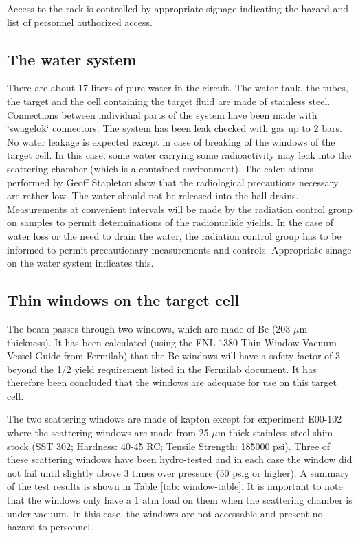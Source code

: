 {Access to the rack is controlled by appropriate signage indicating
the hazard and list of personnel authorized access.


\begin{safetyen}{10}{10}
\subsection{The water system}
\end{safetyen}

There are about 17 liters of pure water in the circuit. The water
tank, the tubes, the target and the cell containing the target fluid
are made of stainless steel. Connections between individual parts
of the system have been made with \char`\"{}swagelok\char`\"{} connectors.
The system has been leak checked with gas up to 2 bars. No water leakage
is expected except in case of breaking of the windows of the target
cell. In this case, some water carrying some radioactivity may leak
into the scattering chamber (which is a contained environment). The
calculations performed by Geoff Stapleton show that
the radiological precautions necessary are rather low. The water should
not be released into the hall drains. Measurements at convenient intervals
will be made by the radiation control group on samples to permit determinations
of the radionuclide yields. In the case of water loss or the need
to drain the water, the radiation control group has to be informed
to permit precautionary measurements and controls. Appropriate sinage
on the water system indicates this.

\begin{safetyen}{10}{10}
\subsection{Thin windows on the target cell}
\end{safetyen}

The beam passes through two windows, which are made of Be (203 $\mu $m
thickness). It has been calculated (using the FNL-1380 Thin Window
Vacuum Vessel Guide from Fermilab) that the Be windows will have a
safety factor of 3 beyond the 1/2 yield requirement listed in the
Fermilab document. It has therefore been concluded that the windows
are adequate for use on this target cell.

The two scattering windows are made of kapton except for experiment
E00-102 where the scattering windows are made from 25 $\mu $m thick
stainless steel shim stock (SST 302; Hardness: 40-45 RC; Tensile Strength:
185000 psi). Three of these scattering windows have been hydro-tested
and in each case the window did not fail until slightly above 3 times
over pressure (50 psig or higher). A summary of the test results is
shown in Table \ref{tab: window-table}. It is important to note that
the windows only have a 1 atm load on them when the scattering chamber
is under vacuum. In this case, the windows are not accessable and
present no hazard to personnel.

}
